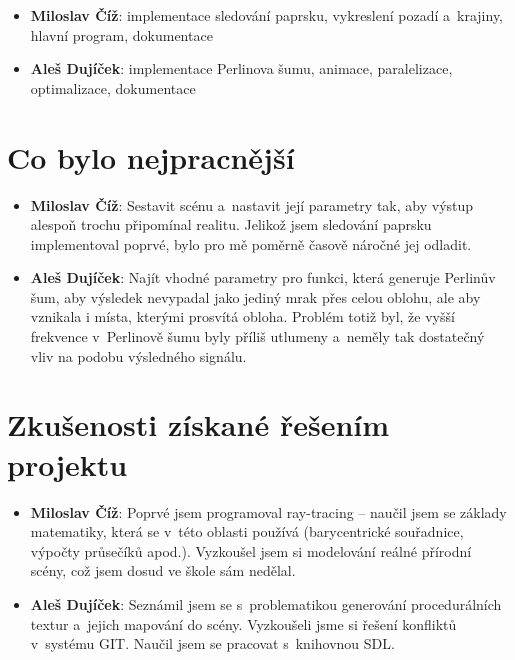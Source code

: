 \documentclass[12pt,a4paper,titlepage,final]{report}
\newcommand\AuthorA{Miloslav Číž}
\newcommand\AuthorB{Aleš Dujíček}
\begin{document}
\begin{itemize}
\item \textbf{\AuthorA}: implementace sledování paprsku, vykreslení pozadí a~krajiny, hlavní program, dokumentace
\item \textbf{\AuthorB}: implementace Perlinova šumu, animace, paralelizace, optimalizace, dokumentace
\end{itemize}

\section{Co bylo nejpracnější}


\begin{itemize}
\item \textbf{\AuthorA}: Sestavit scénu a~nastavit její parametry tak,
aby výstup alespoň trochu připomínal realitu. Jelikož jsem sledování
paprsku implementoval poprvé, bylo pro mě poměrně časově náročné jej
odladit.
\item \textbf{\AuthorB}: Najít vhodné parametry pro funkci, která generuje
Perlinův šum, aby výsledek nevypadal jako jediný mrak přes celou oblohu,
ale aby vznikala i místa, kterými prosvítá obloha. Problém totiž byl, že vyšší
frekvence v~Perlinově šumu byly příliš utlumeny a~neměly tak dostatečný vliv
na podobu výsledného signálu.
\end{itemize}

\section{Zkušenosti získané řešením projektu}

\begin{itemize}
\item \textbf{\AuthorA}: Poprvé jsem programoval ray-tracing -- naučil
jsem se základy matematiky, která se v~této oblasti
používá (barycentrické souřadnice, výpočty průsečíků apod.). Vyzkoušel
jsem si modelování reálné přírodní scény, což jsem dosud ve škole sám
nedělal.
\item \textbf{\AuthorB}: Seznámil jsem se s~problematikou generování
procedurálních textur a~jejich mapování do scény. Vyzkoušeli jsme si
řešení konfliktů v~systému GIT. Naučil jsem se pracovat s~knihovnou SDL.
\end{itemize}
\end{document}
